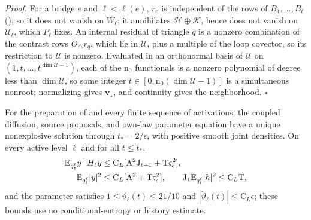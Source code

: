 \noindent\emph{Proof.}
For a bridge \(e\) and \(\ell<\ell(e)\), \(r_e\) is independent of the rows of
\(B_1,\ldots,B_\ell\) (), so it does not vanish
on \(W_\ell\); it annihilates \(\mathcal H\oplus\mathcal K\), hence does not
vanish on \(\mathcal U_\ell\), which \(P_\ell\) fixes. An internal residual of
triangle \(q\) is a nonzero combination of the contrast rows
\(O_\triangle r_q\), which lie in \(\mathcal U\), plus a multiple of the loop
covector, so its restriction to \(\mathcal U\) is nonzero. Evaluated in an
orthonormal basis of \(\mathcal U\) on \((1,t,\ldots,t^{\dim\mathcal U-1})\),
each of the \(\mathrm n_0\) functionals is a nonzero polynomial of degree less
than \(\dim\mathcal U\), so some integer \(t\in[0,\mathrm n_0(\dim\mathcal U-1)]\)
is a simultaneous nonroot; normalizing gives \(\mathbf v_\star\), and
continuity gives the neighborhood. \(\square\)

For the preparation of  and every finite
sequence of activations, the coupled diffusion, source proposals, and own-law
parameter equation have a unique nonexplosive solution through
\(t_*=2/\epsilon\), with positive smooth joint densities. On every active level
\(\ell\) and for all \(t\le t_*\),
\begin{align}
 \mathbb E_{q_t^\ell}y^\top H_\ell y
 &\le \mathrm C_L[\mathrm A^2\mathrm J_{\ell+1}+\mathrm T\varsigma_\epsilon^2],
 \label{eq:rg-formation-actual-energy}\\
 \mathbb E_{q_t^\ell}|y|^2
 &\le \mathrm C_L[\mathrm A^2+\mathrm T\varsigma_\epsilon^2],
 \qquad \mathrm J_1\mathbb E_{q_t^\ell}|h|^2\le \mathrm C_L\mathrm T,
 \label{eq:rg-formation-actual-moments}
\end{align}
and the parameter satisfies \(1\le\vartheta_\ell(t)\le21/10\) and
\(|\dot\vartheta_\ell(t)|\le\mathrm C_L\epsilon\); these bounds use no
conditional-entropy or history estimate. 

